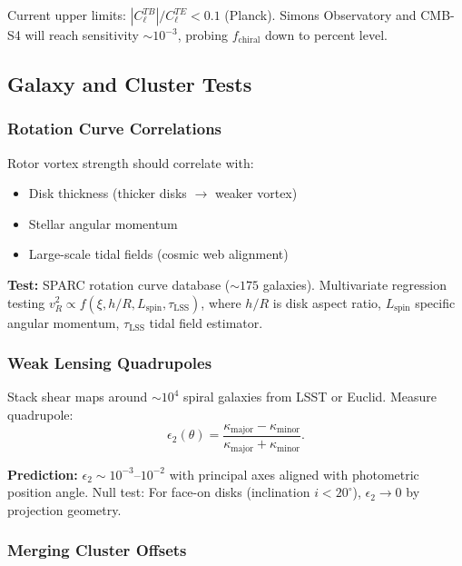 \documentclass[11pt,a4paper]{article}
\numberwithin{equation}{section}
\theoremstyle{plain}
\theoremstyle{definition}
\theoremstyle{remark}
\begin{document}
Current upper limits: $|C_\ell^{TB}|/C_\ell^{TE} < 0.1$ (Planck). Simons Observatory and CMB-S4 will reach sensitivity $\sim 10^{-3}$, probing $f_{\mathrm{chiral}}$ down to percent level.

\subsection{Galaxy and Cluster Tests}

\subsubsection{Rotation Curve Correlations}

Rotor vortex strength should correlate with:
\begin{itemize}
\item Disk thickness (thicker disks $\to$ weaker vortex)
\item Stellar angular momentum
\item Large-scale tidal fields (cosmic web alignment)
\end{itemize}

\textbf{Test:} SPARC rotation curve database ($\sim 175$ galaxies). Multivariate regression testing $v_R^2 \propto f(\xi, h/R, L_{\mathrm{spin}}, \tau_{\mathrm{LSS}})$, where $h/R$ is disk aspect ratio, $L_{\mathrm{spin}}$ specific angular momentum, $\tau_{\mathrm{LSS}}$ tidal field estimator.

\subsubsection{Weak Lensing Quadrupoles}

Stack shear maps around $\sim 10^4$ spiral galaxies from LSST or Euclid. Measure quadrupole:
\begin{equation}
\epsilon_2(\theta) = \frac{\kappa_{\mathrm{major}} - \kappa_{\mathrm{minor}}}{\kappa_{\mathrm{major}} + \kappa_{\mathrm{minor}}}.
\end{equation}

\textbf{Prediction:} $\epsilon_2 \sim 10^{-3}$–$10^{-2}$ with principal axes aligned with photometric position angle. Null test: For face-on disks (inclination $i < 20^\circ$), $\epsilon_2 \to 0$ by projection geometry.

\subsubsection{Merging Cluster Offsets}
\end{document}
